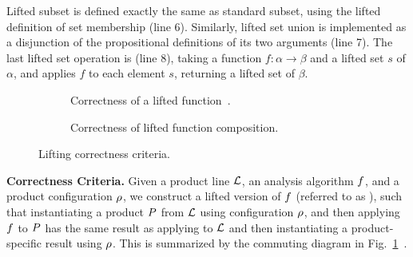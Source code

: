 Lifted subset is defined exactly the same as standard subset, using the lifted definition of set membership (line 6). Similarly, lifted set union is implemented as a disjunction of the propositional definitions of its two arguments (line 7). The last lifted set operation is  (line 8), taking a function $f : \alpha \to \beta$ and a lifted set $s$ of $\alpha$, and applies $f$ to each element $s$, returning a lifted set of $\beta$.

\begin{figure}[t]
	\begin{subfigure}[c]{0.45\textwidth}
		\centering
		\caption{Correctness of a lifted function~\cite{Shahin:2020}.}
		\label{fig:correctness1}
	\end{subfigure}
	\hfill
	\begin{subfigure}[c]{0.55\textwidth}
		\centering
		\caption{Correctness of lifted function composition.}
		\label{fig:correctness2}
	\end{subfigure}
	\vspace{-0.1in}
	\caption{Lifting correctness criteria.}
	\label{fig:correctness}
	\vspace{-0.2in}
\end{figure}



\vspace{0.1in}
\noindent
{\bf Correctness Criteria.}
Given a product line $\mathcal{L}$, an analysis algorithm $\analysis$, and a product configuration $\rho$, we construct a lifted version of $\analysis$ (referred to as \lift{$\analysis$}), such that instantiating a product $P$ from $\mathcal{L}$ using configuration $\rho$, and then applying $\analysis$ to $P$ has the same result as applying \lift{$\analysis$} to $\mathcal{L}$ and then instantiating a product-specific result using $\rho$. This is summarized by the commuting diagram in Fig.~\ref{fig:correctness1}~\cite{Shahin:2020}.


